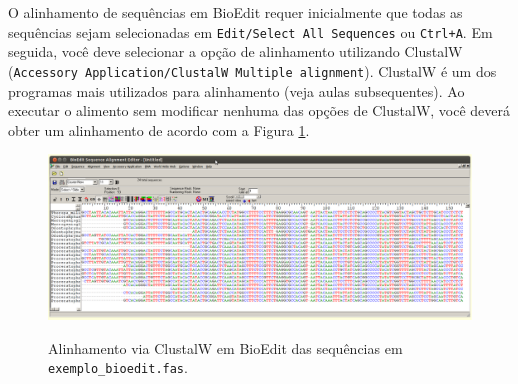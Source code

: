 \begin{refsection}

O alinhamento de sequências em BioEdit requer inicialmente que todas as sequências sejam selecionadas em \texttt{Edit/Select All Sequences} ou \texttt{Ctrl+A}. Em seguida, você deve selecionar a opção de alinhamento utilizando ClustalW (\texttt{Accessory Application/ClustalW Multiple alignment}). ClustalW \parencite{Larkin_et_al_2007} é um dos programas mais utilizados para alinhamento (veja aulas subsequentes). Ao executar o alimento sem modificar nenhuma das opções de ClustalW, você deverá obter um alinhamento de acordo com a Figura \ref{tut7:fig:bioedit_aligned}.\\

  \begin{figure}[h!]
      {\includegraphics[scale=0.3]{figures/tut7/bioedit_aligned.eps}}
	{\caption[Bioedit: alinhamento]{Alinhamento via ClustalW em BioEdit das sequências em \texttt{exemplo\_bioedit.fas}.}\label{tut7:fig:bioedit_aligned}}
  \end{figure}



\end{refsection}
